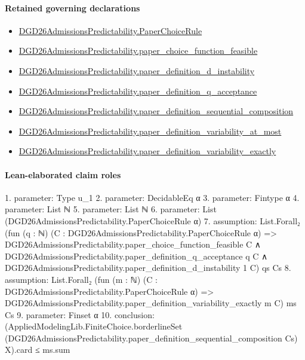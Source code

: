 \documentclass[10pt]{article}
\begin{document}
\paragraph{Retained governing declarations}
\begin{itemize}\raggedright
\item \hyperlink{governing-declaration-4678951b4432b184}{DGD26\allowbreak{}Admissions\allowbreak{}Predictability.\allowbreak{}Paper\allowbreak{}Choice\allowbreak{}Rule}
\item \hyperlink{governing-declaration-f7de74a44053f6d5}{DGD26\allowbreak{}Admissions\allowbreak{}Predictability.\allowbreak{}paper\_\allowbreak{}choice\_\allowbreak{}function\_\allowbreak{}feasible}
\item \hyperlink{governing-declaration-ce2c1c7a5233a84a}{DGD26\allowbreak{}Admissions\allowbreak{}Predictability.\allowbreak{}paper\_\allowbreak{}definition\_\allowbreak{}d\_\allowbreak{}instability}
\item \hyperlink{governing-declaration-7ecd62274fb2f391}{DGD26\allowbreak{}Admissions\allowbreak{}Predictability.\allowbreak{}paper\_\allowbreak{}definition\_\allowbreak{}q\_\allowbreak{}acceptance}
\item \hyperlink{governing-declaration-c10b5862fabcb2c0}{DGD26\allowbreak{}Admissions\allowbreak{}Predictability.\allowbreak{}paper\_\allowbreak{}definition\_\allowbreak{}sequential\_\allowbreak{}composition}
\item \hyperlink{governing-declaration-e5ed62be2897e9e6}{DGD26\allowbreak{}Admissions\allowbreak{}Predictability.\allowbreak{}paper\_\allowbreak{}definition\_\allowbreak{}variability\_\allowbreak{}at\_\allowbreak{}most}
\item \hyperlink{governing-declaration-ce6697be3f1c2256}{DGD26\allowbreak{}Admissions\allowbreak{}Predictability.\allowbreak{}paper\_\allowbreak{}definition\_\allowbreak{}variability\_\allowbreak{}exactly}
\end{itemize}
\paragraph{Lean-elaborated claim roles}\begin{ReviewVerbatim}
1. parameter: Type u_1
2. parameter: DecidableEq α
3. parameter: Fintype α
4. parameter: List ℕ
5. parameter: List ℕ
6. parameter: List (DGD26AdmissionsPredictability.PaperChoiceRule α)
7. assumption: List.Forall₂
  (fun (q : ℕ) (C : DGD26AdmissionsPredictability.PaperChoiceRule α) =>
    DGD26AdmissionsPredictability.paper_choice_function_feasible C ∧
      DGD26AdmissionsPredictability.paper_definition_q_acceptance q C ∧
        DGD26AdmissionsPredictability.paper_definition_d_instability 1 C)
  qs Cs
8. assumption: List.Forall₂
  (fun (m : ℕ) (C : DGD26AdmissionsPredictability.PaperChoiceRule α) =>
    DGD26AdmissionsPredictability.paper_definition_variability_exactly m C)
  ms Cs
9. parameter: Finset α
10. conclusion: (AppliedModelingLib.FiniteChoice.borderlineSet
      (DGD26AdmissionsPredictability.paper_definition_sequential_composition Cs) X).card ≤
  ms.sum
\end{ReviewVerbatim}
\end{document}
